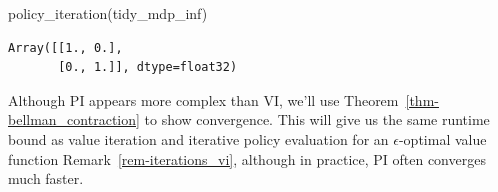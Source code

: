 \documentclass[
  letterpaper,
  DIV=11,
  numbers=noendperiod]{scrreprt}
\newenvironment{Shaded}{\begin{snugshade}}{\end{snugshade}}
\newcommand{\NormalTok}[1]{\textcolor[rgb]{0.00,0.23,0.31}{#1}}
\theoremstyle{plain}
\theoremstyle{plain}
\theoremstyle{definition}
\theoremstyle{definition}
\theoremstyle{remark}
\begin{document}
\begin{Shaded}
\begin{Highlighting}[]
\NormalTok{policy\_iteration(tidy\_mdp\_inf)}
\end{Highlighting}
\end{Shaded}

\begin{verbatim}
Array([[1., 0.],
       [0., 1.]], dtype=float32)
\end{verbatim}

Although PI appears more complex than VI, we'll use
Theorem~\ref{thm-bellman_contraction} to show convergence. This will
give us the same runtime bound as value iteration and iterative policy
evaluation for an \(\epsilon\)-optimal value function
Remark~\ref{rem-iterations_vi}, although in practice, PI often converges
much faster.
\end{document}
